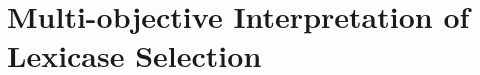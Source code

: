 \documentclass[twoside]{article}
\begin{document}
%


 


\section{Multi-objective Interpretation of Lexicase Selection}\label{s:mo}
\end{document}
